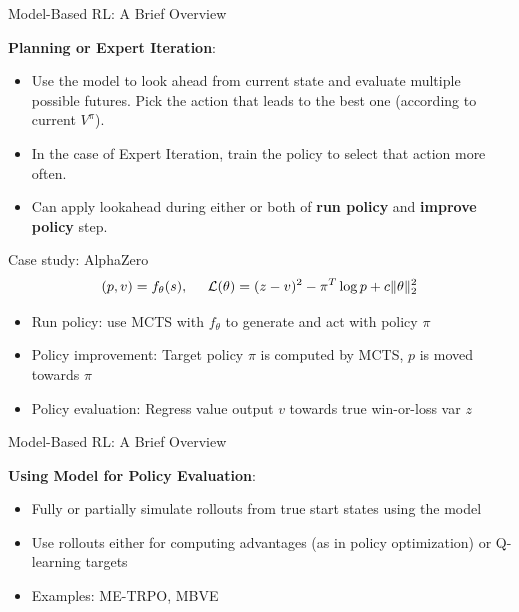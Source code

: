 \documentclass[9pt]{beamer}
\begin{document}
\begin{frame}{Model-Based RL: A Brief Overview}

\textbf{Planning or Expert Iteration}:
\begin{itemize}
\item Use the model to look ahead from current state and evaluate multiple possible futures. Pick the action that leads to the best one (according to current $V^{\pi}$).
\item In the case of Expert Iteration, train the policy to select that action more often.
\item Can apply lookahead during either or both of \textbf{run policy} and \textbf{improve policy} step.
\end{itemize}

\vspace{2em}
Case study: AlphaZero
%
\begin{equation*}
(p,v) = f_{\theta}(s), \;\;\;\;\; {\mathcal L}(\theta) = (z - v)^2 - \pi^T \log p + c \|\theta\|_2^2
\end{equation*}

\begin{itemize}
\item Run policy: use MCTS with $f_{\theta}$ to generate and act with policy $\pi$
\item Policy improvement: Target policy $\pi$ is computed by MCTS, $p$ is moved towards $\pi$
\item Policy evaluation: Regress value output $v$ towards true win-or-loss var $z$
\end{itemize}

\end{frame}

\begin{frame}{Model-Based RL: A Brief Overview}

\textbf{Using Model for Policy Evaluation}:
\begin{itemize}
\item Fully or partially simulate rollouts from true start states using the model
\item Use rollouts either for computing advantages (as in policy optimization) or Q-learning targets
\item Examples: ME-TRPO, MBVE
\end{itemize}
\end{frame}
\end{document}
